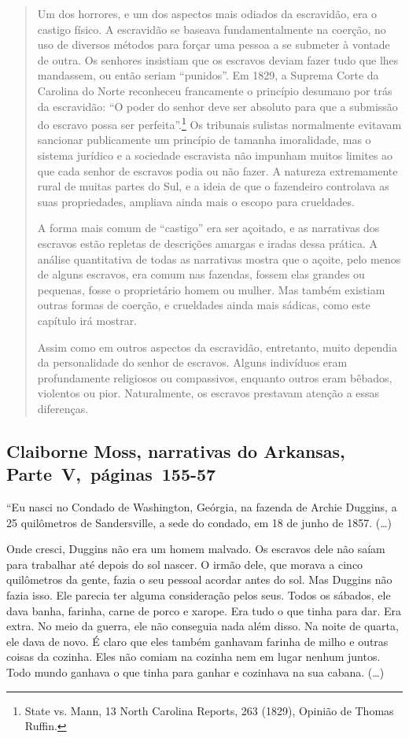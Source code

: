 \begin{quote}
Um dos horrores, e um dos aspectos mais odiados da escravidão, era
o castigo físico. A escravidão se baseava fundamentalmente na coerção,
no uso de diversos métodos para forçar uma pessoa a se submeter à
vontade de outra. Os senhores insistiam que os escravos deviam fazer
tudo que lhes mandassem, ou então seriam ``punidos''. Em 1829, a Suprema
Corte da Carolina do Norte reconheceu francamente o princípio desumano
por trás da escravidão: ``O poder do senhor deve ser absoluto para que a
submissão do escravo possa ser perfeita''.\footnote{State vs. Mann, 13
  North Carolina Reports, 263 (1829), Opinião de Thomas Ruffin.}
Os tribunais sulistas normalmente evitavam sancionar publicamente
um princípio de tamanha imoralidade, mas o sistema jurídico e a
sociedade escravista não impunham muitos limites ao que cada senhor de
escravos podia ou não fazer. A natureza extremamente rural de muitas
partes do Sul, e a ideia de que o fazendeiro controlava as suas
propriedades, ampliava ainda mais o escopo para crueldades.

A forma mais comum de ``castigo'' era ser açoitado, e as
narrativas dos escravos estão repletas de descrições amargas e iradas
dessa prática. A análise quantitativa de todas as narrativas mostra que
o açoite, pelo menos de alguns escravos, era comum nas fazendas, fossem
elas grandes ou pequenas, fosse o proprietário homem ou mulher. Mas
também existiam outras formas de coerção, e crueldades ainda mais
sádicas, como este capítulo irá mostrar.

Assim como em outros aspectos da escravidão, entretanto, muito
dependia da personalidade do senhor de escravos. Alguns indivíduos eram
profundamente religiosos ou compassivos, enquanto outros eram bêbados,
violentos ou pior. Naturalmente, os escravos prestavam atenção a essas
diferenças.
\end{quote}

\subsection{Claiborne Moss, narrativas do Arkansas, Parte~V,~páginas~155-57}
\label{ref203}

``Eu nasci no Condado de Washington, Geórgia, na fazenda de Archie
Duggins, a 25 quilômetros de Sandersville, a sede do condado, em 18 de
junho de 1857. (\ldots{})

Onde cresci, Duggins não era um homem malvado. Os escravos dele não
saíam para trabalhar até depois do sol nascer. O irmão dele, que morava
a cinco quilômetros da gente, fazia o seu pessoal acordar antes do sol.
Mas Duggins não fazia isso. Ele parecia ter alguma consideração pelos
seus. Todos os sábados, ele dava banha, farinha, carne de porco e
xarope. Era tudo o que tinha para dar. Era extra. No meio da guerra, ele
não conseguia nada além disso. Na noite de quarta, ele dava de novo. É
claro que eles também ganhavam farinha de milho e outras coisas da
cozinha. Eles não comiam na cozinha nem em lugar nenhum juntos. Todo
mundo ganhava o que tinha para ganhar e cozinhava na sua cabana.
(\ldots{})

